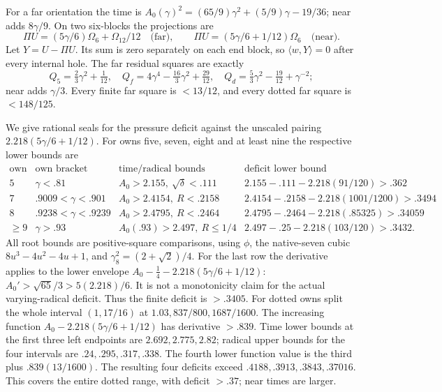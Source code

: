 \documentclass[11pt]{article}
\theoremstyle{definition}
\theoremstyle{remark}
\newcommand{\ip}[2]{\langle #1,#2\rangle}
\begin{document}
For a far orientation the time is
\(A_0(\gamma)^2=(65/9)\gamma^2+(5/9)\gamma-19/36\);
near adds \(8\gamma/9\).
On two six-blocks the projections are
\[
 \Pi U=(5\gamma/6)\Omega_6+\Omega_{12}/12\quad\text{(far)},\qquad
 \Pi U=(5\gamma/6+1/12)\Omega_6\quad\text{(near)} .
\]
Let \(Y=U-\Pi U\). Its sum is zero separately on each end block,
so \(\ip wY=0\) after every internal hole.
The far residual squares are exactly
\[
 Q_5=\tfrac23\gamma^2+\tfrac1{12},\quad
 Q_f=4\gamma^4-\tfrac{16}3\gamma^2+\tfrac{29}{12},\quad
 Q_d=\tfrac53\gamma^2-\tfrac{19}{12}+\gamma^{-2};
\]
near adds \(\gamma/3\).
Every finite far square is \(<13/12\), and every dotted far square
is \(<148/125\).

We give rational seals for the pressure deficit against the unscaled
pairing \(2.218(5\gamma/6+1/12)\).
For owns five, seven, eight and at least nine the respective lower bounds
are
\[
\begin{array}{c|c|c|c}
\text{own}&\text{own bracket}&\text{time/radical bounds}&
 \text{deficit lower bound}\\ \hline
5&\gamma<.81&A_0>2.155,\ \sqrt\delta<.111&
 2.155-.111-2.218(91/120)>.362\\
7&.9009<\gamma<.901&A_0>2.4154,\ R<.2158&
 2.4154-.2158-2.218(1001/1200)>.3494\\
8&.9238<\gamma<.9239&A_0>2.4795,\ R<.2464&
 2.4795-.2464-2.218(.85325)>.34059\\
\geq9&\gamma>.93&A_0(.93)>2.497,\ R\leq1/4&
 2.497-.25-2.218(103/120)>.3432 .
\end{array}
\]
All root bounds are positive-square comparisons, using
\(\phi\), the native-seven cubic \(8u^3-4u^2-4u+1\), and
\(\gamma_8^2=(2+\sqrt2)/4\).
For the last row the derivative applies to the lower envelope
\(A_0-\tfrac14-2.218(5\gamma/6+1/12)\):
\(A_0'>\sqrt{65}/3>5(2.218)/6\).
It is not a monotonicity claim for the actual varying-radical deficit.
Thus the finite deficit is \(>.3405\).
For dotted owns split the whole interval \((1,17/16)\) at
\(1.03,837/800,1687/1600\).
The increasing function \(A_0-2.218(5\gamma/6+1/12)\) has
derivative \(>.839\).
Time lower bounds at the first three left endpoints are
\(2.692,2.775,2.82\); radical upper bounds for the four intervals
are \(.24,.295,.317,.338\).
The fourth lower function value is the third plus
\(.839(13/1600)\).
The resulting four deficits exceed
\(.4188,.3913,.3843,.37016\).
This covers the entire dotted range, with deficit \(>.37\);
near times are larger.
\end{document}
